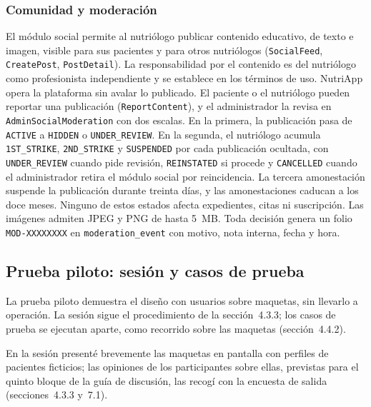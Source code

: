 \documentclass[12pt, a4paper]{article}
\begin{document}
\subsubsection{Comunidad y moderación}
 
\begin{sloppypar}
El módulo social permite al nutriólogo publicar contenido educativo, de
texto e imagen, visible para sus pacientes y para otros nutriólogos
(\texttt{SocialFeed}, \texttt{CreatePost}, \texttt{PostDetail}). La
responsabilidad por el contenido es del nutriólogo como profesionista
independiente y se establece en los términos de uso. NutriApp opera la
plataforma sin avalar lo publicado. El paciente o el nutriólogo pueden
reportar una publicación (\texttt{ReportContent}), y el administrador la
revisa en \texttt{AdminSocialModeration} con dos escalas. En la primera,
la publicación pasa de \texttt{ACTIVE} a \texttt{HIDDEN} o
\texttt{UNDER\_REVIEW}. En la segunda, el nutriólogo acumula
\texttt{1ST\_STRIKE}, \texttt{2ND\_STRIKE} y \texttt{SUSPENDED} por cada
publicación ocultada, con \texttt{UNDER\_REVIEW} cuando pide revisión,
\texttt{REINSTATED} si procede y \texttt{CANCELLED} cuando el
administrador retira el módulo social por reincidencia. La tercera
amonestación suspende la publicación durante treinta días, y las
amonestaciones caducan a los doce meses. Ninguno de estos estados afecta
expedientes, citas ni suscripción. Las imágenes admiten JPEG y PNG de
hasta 5~MB. Toda decisión genera un folio \texttt{MOD-XXXXXXXX} en
\texttt{moderation\_event} con motivo, nota interna, fecha y hora.
\end{sloppypar}
 
\subsection{Prueba piloto: sesión y casos de prueba}
 
La prueba piloto
demuestra el diseño con usuarios sobre maquetas, sin llevarlo a
operación. La sesión sigue el procedimiento de la
sección~4.3.3; los casos de prueba se ejecutan aparte, como recorrido
sobre las maquetas (sección~4.4.2).
 
En la sesión presenté brevemente las maquetas en pantalla con
perfiles de pacientes ficticios; las opiniones de los participantes
sobre ellas, previstas para el quinto bloque de la guía de discusión,
las recogí con la encuesta de salida (secciones~4.3.3 y~7.1).
 
\end{document}
